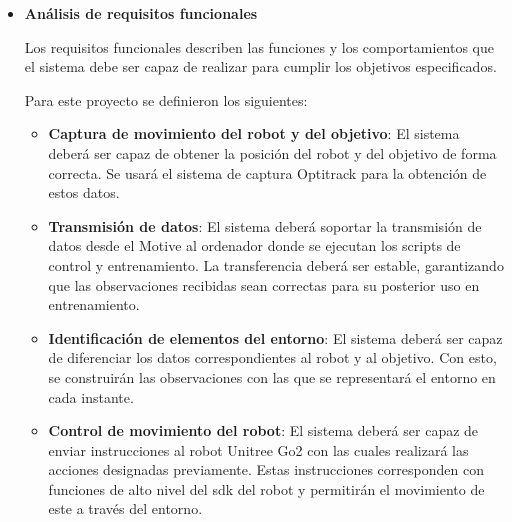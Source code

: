 \begin{itemize}
\begin{itemize}
        \item Desarrollo en entorno real: Configuración del entorno Optitrack, transmisión de datos en streaming, control de robot Go2 y 
        entrenamiento y validación de los modelos. Se trata del paso final del proyecto y sirve como prueba de la idea central del trabajo.

    \end{itemize}

    Se ideó siguiendo un planteamiento incremental, priorizando tareas “sencillas”, como la configuración del sistema de cámaras o la 
    transferencia de datos, partes esenciales para el posterior entrenamiento de los modelos. Las funciones no esenciales, como implementación 
    de locomoción a bajo nivel, quedaron descartadas debido a la sobrecomplejidad que suponían.

    \item \textbf{Análisis de requisitos funcionales}

    Los requisitos funcionales describen las funciones y los comportamientos que el sistema debe ser capaz de realizar para cumplir los objetivos 
    especificados. 
    
    Para este proyecto se definieron los siguientes:
    
    \begin{itemize}
    
        \item \textbf{Captura de movimiento del robot y del objetivo}:
        El sistema deberá ser capaz de obtener la posición del robot y del objetivo de forma correcta. Se usará el sistema de captura Optitrack para la 
        obtención de estos datos.
    
        \item \textbf{Transmisión de datos}:
        El sistema deberá soportar la transmisión de datos desde el Motive al ordenador donde se ejecutan los scripts de control y entrenamiento. La 
        transferencia deberá ser estable, garantizando que las observaciones recibidas sean correctas para su posterior uso en entrenamiento.

        \item \textbf{Identificación de elementos del entorno}:
        El sistema deberá ser capaz de diferenciar los datos correspondientes al robot y al objetivo. Con esto, se construirán las observaciones con las 
        que se representará el entorno en cada instante.

        \item \textbf{Control de movimiento del robot}:
        El sistema deberá ser capaz de enviar instrucciones al robot Unitree Go2 con las cuales realizará las acciones designadas previamente. Estas instrucciones 
        corresponden con funciones de alto nivel del \Gls{sdk} del robot y permitirán el movimiento de este a través del entorno.


\end{itemize}
\end{itemize}
